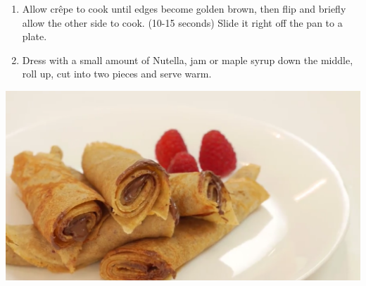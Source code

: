 \documentclass{article}
\begin{document}
\begin{multicols}{2}
\begin{enumerate}
\item Allow crêpe to cook until edges become golden brown, then flip and briefly allow the other side to cook. (10-15 seconds) Slide it right off the pan to a plate.

\item Dress with a small amount of Nutella, jam or maple syrup down the middle, roll up, cut into two pieces and serve warm.
\end{enumerate}




\end{multicols}



\begin{center}
\includegraphics[scale=0.4]{Crepes.png}
\end{center}
\end{document}
